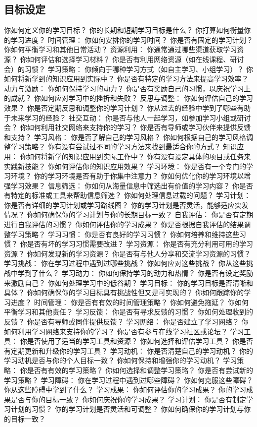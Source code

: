 \documentclass[12pt]{book}
\begin{document}
\subsection{目标设定}
你如何定义你的学习目标？
你的长期和短期学习目标是什么？
你打算如何衡量你的学习进度？
时间管理：
你如何安排你的学习时间？
你是否有固定的学习计划？
你如何平衡学习和其他日常活动？
资源利用：
你通常通过哪些渠道获取学习资源？
你如何评估和选择学习材料？
你是否有利用网络资源（如在线课程、研讨会）的习惯？
学习策略：
你倾向于哪种学习方式（如自主学习、小组学习）？
你如何将新学到的知识应用到实际中？
你是否有特定的学习方法来提高学习效率？
动力与激励：
你如何保持学习的动力？
你是否有奖励自己的习惯，以庆祝学习上的成就？
你如何应对学习中的挫折和失败？
反思与调整：
你如何评估自己的学习效果？
你是否定期反思和调整你的学习计划？
你从过去的经验中学到了哪些有助于未来学习的经验？
社交互动：
你是否与他人一起学习，如参加学习小组或研讨会？
你如何利用社交网络来支持你的学习？
你是否有导师或学习伙伴来提供反馈和支持？
学习风格：
你是否了解自己的学习风格？
你如何根据自己的学习风格调整学习策略？
你有没有尝试过不同的学习方法来找到最适合你的方式？
知识应用：
你如何将新学的知识应用到实际工作中？
你有没有设定具体的项目或任务来实践新技能？
你如何评估你的知识应用效果？
学习环境：
你是否有一个专门的学习环境？
你的学习环境是否有助于你集中注意力？
你如何优化你的学习环境以增强学习效果？
信息筛选：
你如何从海量信息中筛选出有价值的学习内容？
你是否有特定的标准或工具来帮助信息筛选？
你如何处理信息过载的问题？
学习计划：
你是否有详细的学习计划或学习路线图？
你的学习计划是否灵活，能够适应突发情况？
你如何确保你的学习计划与你的长期目标一致？
自我评估：
你是否有定期进行自我评估的习惯？
你如何评估你的学习成果？
你是否根据自我评估的结果调整学习策略？
学习习惯：
你是否有良好的学习习惯？
你如何培养和维持这些习惯？
你是否有坏的学习习惯需要改进？
学习资源：
你是否有充分利用可用的学习资源？
你如何发现新的学习资源？
你是否有与他人分享和交流学习资源的习惯？
学习挑战：
你在学习过程中遇到过哪些挑战？
你如何应对这些挑战？
你从这些挑战中学到了什么？
学习动力：
你如何保持学习的动力和热情？
你是否有设定奖励来激励自己？
你如何处理学习中的低谷期？
学习目标：
你的学习目标是否清晰和具体？
你如何确保你的学习目标具有挑战性但又是可实现的？
你如何跟踪你的学习进度？
时间管理：
你是否有有效的时间管理策略？
你如何避免拖延？
你如何平衡学习和其他责任？
学习反馈：
你是否有寻求反馈的习惯？
你如何处理收到的反馈？
你是否有导师或同伴提供反馈？
学习网络：
你是否建立了学习网络？
你如何利用学习网络来支持你的学习？
你是否有参与在线学习社区或论坛？
学习工具：
你是否使用了适当的学习工具和资源？
你如何选择和评估学习工具？
你是否有定期更新和升级你的学习工具？
学习动机：
你是否清楚自己的学习动机？
你的学习动机是否与你的个人目标一致？
你如何保持和增强你的学习动机？
学习策略：
你是否有有效的学习策略？
你如何选择和调整学习策略？
你是否有尝试新的学习策略？
学习障碍：
你在学习过程中遇到过哪些障碍？
你如何克服这些障碍？
你从这些障碍中学到了什么？
学习成果：
你如何评估你的学习成果？
你的学习成果是否与你的目标一致？
你如何庆祝你的学习成果？
学习计划：
你是否有制定学习计划的习惯？
你的学习计划是否灵活和可调整？
你如何确保你的学习计划与你的目标一致？
\end{document}
